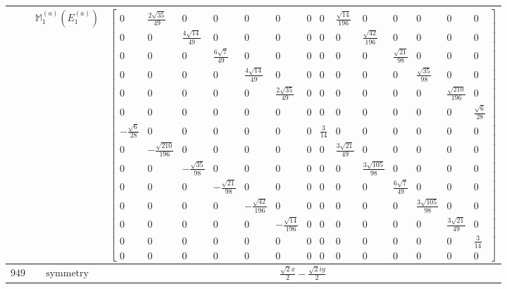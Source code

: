\documentclass[fleqn,8pt,landscape]{jsarticle}
\begin{document}
\begin{longtable}{ccc}
$  $ & $ \mathbb{M}_{1}^{(a)}(E_{1}^{(a)}) $ & $ \begin{bmatrix} 0 & \frac{2 \sqrt{35}}{49} & 0 & 0 & 0 & 0 & 0 & 0 & \frac{\sqrt{14}}{196} & 0 & 0 & 0 & 0 & 0 \\ 0 & 0 & \frac{4 \sqrt{14}}{49} & 0 & 0 & 0 & 0 & 0 & 0 & \frac{\sqrt{42}}{196} & 0 & 0 & 0 & 0 \\ 0 & 0 & 0 & \frac{6 \sqrt{7}}{49} & 0 & 0 & 0 & 0 & 0 & 0 & \frac{\sqrt{21}}{98} & 0 & 0 & 0 \\ 0 & 0 & 0 & 0 & \frac{4 \sqrt{14}}{49} & 0 & 0 & 0 & 0 & 0 & 0 & \frac{\sqrt{35}}{98} & 0 & 0 \\ 0 & 0 & 0 & 0 & 0 & \frac{2 \sqrt{35}}{49} & 0 & 0 & 0 & 0 & 0 & 0 & \frac{\sqrt{210}}{196} & 0 \\ 0 & 0 & 0 & 0 & 0 & 0 & 0 & 0 & 0 & 0 & 0 & 0 & 0 & \frac{\sqrt{6}}{28} \\ - \frac{\sqrt{6}}{28} & 0 & 0 & 0 & 0 & 0 & 0 & \frac{3}{14} & 0 & 0 & 0 & 0 & 0 & 0 \\ 0 & - \frac{\sqrt{210}}{196} & 0 & 0 & 0 & 0 & 0 & 0 & \frac{3 \sqrt{21}}{49} & 0 & 0 & 0 & 0 & 0 \\ 0 & 0 & - \frac{\sqrt{35}}{98} & 0 & 0 & 0 & 0 & 0 & 0 & \frac{3 \sqrt{105}}{98} & 0 & 0 & 0 & 0 \\ 0 & 0 & 0 & - \frac{\sqrt{21}}{98} & 0 & 0 & 0 & 0 & 0 & 0 & \frac{6 \sqrt{7}}{49} & 0 & 0 & 0 \\ 0 & 0 & 0 & 0 & - \frac{\sqrt{42}}{196} & 0 & 0 & 0 & 0 & 0 & 0 & \frac{3 \sqrt{105}}{98} & 0 & 0 \\ 0 & 0 & 0 & 0 & 0 & - \frac{\sqrt{14}}{196} & 0 & 0 & 0 & 0 & 0 & 0 & \frac{3 \sqrt{21}}{49} & 0 \\ 0 & 0 & 0 & 0 & 0 & 0 & 0 & 0 & 0 & 0 & 0 & 0 & 0 & \frac{3}{14} \\ 0 & 0 & 0 & 0 & 0 & 0 & 0 & 0 & 0 & 0 & 0 & 0 & 0 & 0 \end{bmatrix} $ \\ \hline
$ 949 $ & $ \text{symmetry} $ & $ \frac{\sqrt{2} x}{2} - \frac{\sqrt{2} i y}{2} $ \\

\end{longtable}
\end{document}
